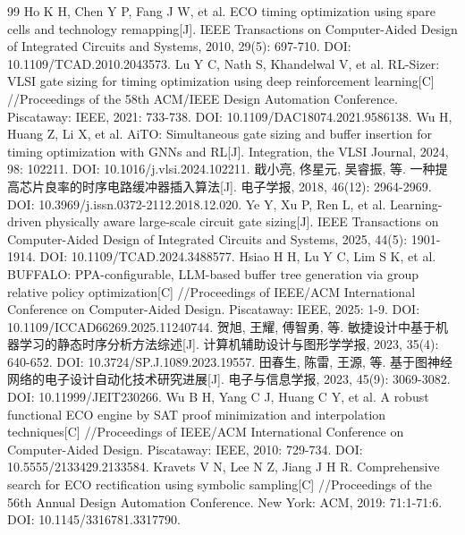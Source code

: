 \documentclass[twocolumn,10pt,fontset=windows]{ctexart}
\begin{document}
\renewcommand{\refname}{参考文献}
\footnotesize\linespread{0.95}\selectfont
\begin{thebibliography}{99}
 Ho K H, Chen Y P, Fang J W, et al. ECO timing optimization using spare cells and technology remapping[J]. IEEE Transactions on Computer-Aided Design of Integrated Circuits and Systems, 2010, 29(5): 697-710. DOI: 10.1109/TCAD.2010.2043573.
 Lu Y C, Nath S, Khandelwal V, et al. RL-Sizer: VLSI gate sizing for timing optimization using deep reinforcement learning[C] //Proceedings of the 58th ACM/IEEE Design Automation Conference. Piscataway: IEEE, 2021: 733-738. DOI: 10.1109/DAC18074.2021.9586138.
 Wu H, Huang Z, Li X, et al. AiTO: Simultaneous gate sizing and buffer insertion for timing optimization with GNNs and RL[J]. Integration, the VLSI Journal, 2024, 98: 102211. DOI: 10.1016/j.vlsi.2024.102211.
 戢小亮, 佟星元, 吴睿振, 等. 一种提高芯片良率的时序电路缓冲器插入算法[J]. 电子学报, 2018, 46(12): 2964-2969. DOI: 10.3969/j.issn.0372-2112.2018.12.020.
 Ye Y, Xu P, Ren L, et al. Learning-driven physically aware large-scale circuit gate sizing[J]. IEEE Transactions on Computer-Aided Design of Integrated Circuits and Systems, 2025, 44(5): 1901-1914. DOI: 10.1109/TCAD.2024.3488577.
 Hsiao H H, Lu Y C, Lim S K, et al. BUFFALO: PPA-configurable, LLM-based buffer tree generation via group relative policy optimization[C] //Proceedings of IEEE/ACM International Conference on Computer-Aided Design. Piscataway: IEEE, 2025: 1-9. DOI: 10.1109/ICCAD66269.2025.11240744.
 贺旭, 王耀, 傅智勇, 等. 敏捷设计中基于机器学习的静态时序分析方法综述[J]. 计算机辅助设计与图形学学报, 2023, 35(4): 640-652. DOI: 10.3724/SP.J.1089.2023.19557.
 田春生, 陈雷, 王源, 等. 基于图神经网络的电子设计自动化技术研究进展[J]. 电子与信息学报, 2023, 45(9): 3069-3082. DOI: 10.11999/JEIT230266.
 Wu B H, Yang C J, Huang C Y, et al. A robust functional ECO engine by SAT proof minimization and interpolation techniques[C] //Proceedings of IEEE/ACM International Conference on Computer-Aided Design. Piscataway: IEEE, 2010: 729-734. DOI: 10.5555/2133429.2133584.
 Kravets V N, Lee N Z, Jiang J H R. Comprehensive search for ECO rectification using symbolic sampling[C] //Proceedings of the 56th Annual Design Automation Conference. New York: ACM, 2019: 71:1-71:6. DOI: 10.1145/3316781.3317790.

\end{thebibliography}
\end{document}
